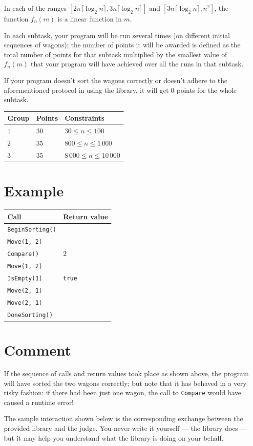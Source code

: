 \noindent
In each of the ranges $[2n\lceil \log_2 n \rceil, 3n\lceil \log_2 n \rceil]$ and
$[3n\lceil \log_2 n \rceil, n^2]$, the function $f_n(m)$ is a linear function in
$m$.

In each subtask, your program will be run several times (on different initial
sequences of wagons); the number of points it will be awarded is defined as the
total number of points for that subtask multiplied by the smallest value of
$f_n(m)$ that your program will have achieved over all the runs in that subtask.

If your program doesn't sort the wagons correctly or doesn't adhere to the
aforementioned protocol in using the library, it will get $0$ points for the
whole subtask.

\noindent
\begin{tabular}{| l | l | p{12cm} |}
  \hline
  \textbf{Group} & \textbf{Points} & \textbf{Constraints} \\ \hline
  $1$ & $30$ & $30 \leq n \leq 100$ \\ \hline
  $2$ & $35$ & $800 \leq n \leq 1\,000$ \\ \hline
  $3$ & $35$ & $8\,000 \leq n \leq 10\,000$ \\ \hline
\end{tabular}

\section*{Example}
\noindent
\begin{tabular}{| l | l |}
  \hline
  \textbf{Call} & \textbf{Return value} \\ \hline
  \texttt{BeginSorting()} &            \\ \hline
  \texttt{Move(1, 2)}     &            \\ \hline
  \texttt{Compare()}      & $2$        \\ \hline
  \texttt{Move(1, 2)}     &            \\ \hline
  \texttt{IsEmpty(1)}     & \texttt{true} \\ \hline
  \texttt{Move(2, 1)}     &            \\ \hline
  \texttt{Move(2, 1)}     &            \\ \hline
  \texttt{DoneSorting()}  &            \\ \hline
\end{tabular}

\section*{Comment}
If the sequence of calls and return values took place as shown above, the
program will have sorted the two wagons correctly; but note that it has behaved
in a very risky fashion: if there had been just one wagon, the call to
\texttt{Compare} would have caused a runtime error!

The sample interaction shown below is the corresponding exchange between the
provided library and the judge. You never write it yourself --- the library does
--- but it may help you understand what the library is doing on your behalf.
